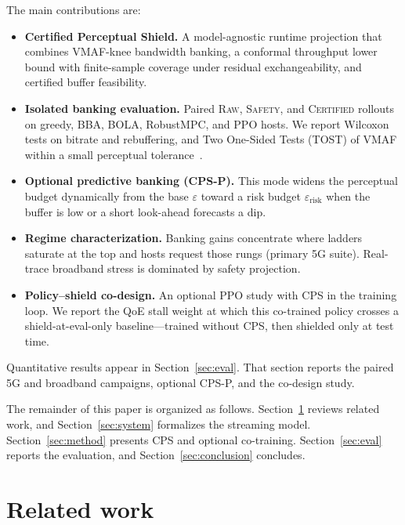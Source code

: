 The main contributions are:
\begin{itemize}
  \item \textbf{Certified Perceptual Shield.} A model-agnostic runtime projection that combines VMAF-knee bandwidth banking, a conformal throughput lower bound with finite-sample coverage under residual exchangeability, and certified buffer feasibility.

  \item \textbf{Isolated banking evaluation.} Paired \textsc{Raw}, \textsc{Safety}, and \textsc{Certified} rollouts on greedy, BBA, BOLA, RobustMPC, and PPO hosts. We report Wilcoxon tests on bitrate and rebuffering, and Two One-Sided Tests (TOST) of VMAF within a small perceptual tolerance~\cite{lakens2017equivalence}.

  \item \textbf{Optional predictive banking (CPS-P).} This mode widens the perceptual budget dynamically from the base \(\varepsilon\) toward a risk budget \(\varepsilon_{\mathrm{risk}}\) when the buffer is low or a short look-ahead forecasts a dip.

  \item \textbf{Regime characterization.} Banking gains concentrate where ladders saturate at the top and hosts request those rungs (primary \mbox{5G} suite). Real-trace broadband stress is dominated by safety projection.

  \item \textbf{Policy--shield co-design.} An optional PPO study with CPS in the training loop. We report the QoE stall weight at which this co-trained policy crosses a shield-at-eval-only baseline---trained without CPS, then shielded only at test time.
\end{itemize}

Quantitative results appear in Section~\ref{sec:eval}. That section reports the paired \mbox{5G} and broadband campaigns, optional CPS-P, and the co-design study.

The remainder of this paper is organized as follows.
Section~\ref{sec:related} reviews related work, and Section~\ref{sec:system} formalizes the streaming model.
Section~\ref{sec:method} presents CPS and optional co-training.
Section~\ref{sec:eval} reports the evaluation, and Section~\ref{sec:conclusion} concludes.

\section{Related work}
\label{sec:related}

